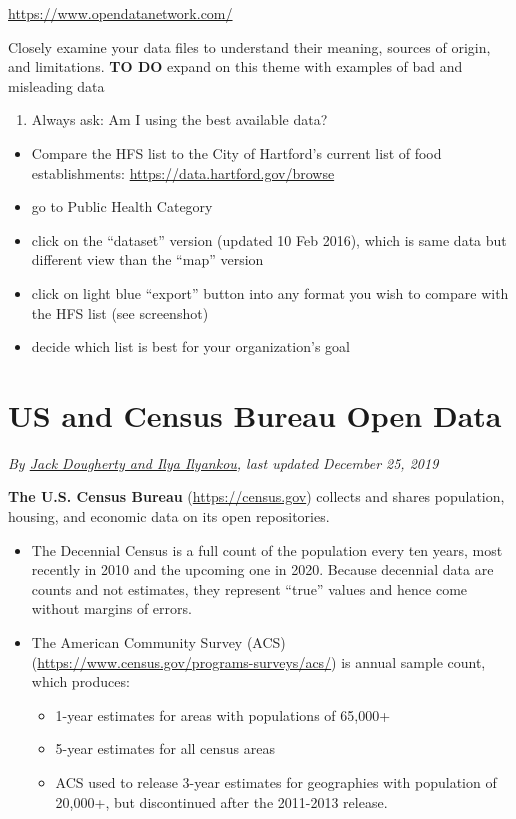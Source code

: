 \documentclass[
  english,
]{book}
\providecommand{\tightlist}{%
  \setlength{\itemsep}{0pt}\setlength{\parskip}{0pt}}
\begin{document}
\url{https://www.opendatanetwork.com/}

Closely examine your data files to understand their meaning, sources of origin, and limitations.
\textbf{TO DO} expand on this theme with examples of bad and misleading data

\begin{enumerate}
\def\labelenumi{\arabic{enumi})}
\tightlist
\item
  Always ask: Am I using the best available data?
\end{enumerate}

\begin{itemize}
\tightlist
\item
  Compare the HFS list to the City of Hartford's current list of food establishments:
  \url{https://data.hartford.gov/browse}
\item
  go to Public Health Category
\item
  click on the ``dataset'' version (updated 10 Feb 2016), which is same data but different view than the ``map'' version
\item
  click on light blue ``export'' button into any format you wish to compare with the HFS list (see screenshot)
\item
  decide which list is best for your organization's goal
\end{itemize}

\hypertarget{census}{%
\section{US and Census Bureau Open Data}\label{census}}

\emph{By \href{authors}{Jack Dougherty and Ilya Ilyankou}, last updated December 25, 2019}

\textbf{The U.S. Census Bureau} (\url{https://census.gov}) collects and shares population, housing, and economic data on its open repositories.

\begin{itemize}
\tightlist
\item
  The Decennial Census is a full count of the population every ten years, most recently in 2010 and the upcoming one in 2020. Because decennial data are counts and not estimates, they represent ``true'' values and hence come without margins of errors.
\item
  The American Community Survey (ACS) (\url{https://www.census.gov/programs-surveys/acs/}) is annual sample count, which produces:

  \begin{itemize}
  \tightlist
  \item
    1-year estimates for areas with populations of 65,000+
  \item
    5-year estimates for all census areas
  \item
    ACS used to release 3-year estimates for geographies with population of 20,000+, but discontinued after the 2011-2013 release.
  \end{itemize}
\end{itemize}
\end{document}
